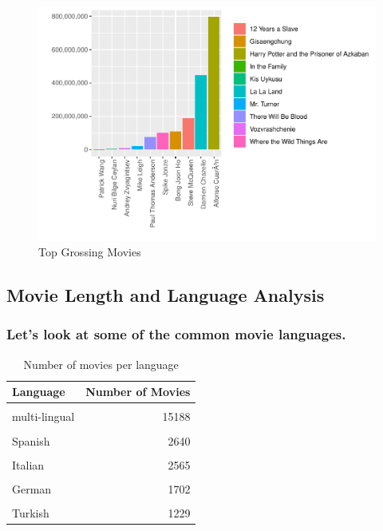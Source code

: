 \documentclass[11pt,a4paper,]{article}
\begin{document}
\begin{figure}[H]

{\centering \includegraphics{Report_files/figure-latex/4-1} 

}

\caption{Top Grossing Movies}\label{fig:4}
\end{figure}

\hypertarget{movie-length-and-language-analysis}{%
\subsection{Movie Length and Language Analysis}\label{movie-length-and-language-analysis}}

\hypertarget{lets-look-at-some-of-the-common-movie-languages.}{%
\subsubsection{Let's look at some of the common movie languages.}\label{lets-look-at-some-of-the-common-movie-languages.}}

\begin{table}[!h]

\caption{\label{tab:langtab}Number of movies per language}
\centering
\begin{tabular}[t]{l|r}
\hline
Language & Number of Movies\\
\hline
\cellcolor{gray!6}{English} & \cellcolor{gray!6}{34519}\\
\hline
multi-lingual & 15188\\
\hline
\cellcolor{gray!6}{French} & \cellcolor{gray!6}{3777}\\
\hline
Spanish & 2640\\
\hline
\cellcolor{gray!6}{Japanese} & \cellcolor{gray!6}{2605}\\
\hline
Italian & 2565\\
\hline
\cellcolor{gray!6}{Hindi} & \cellcolor{gray!6}{1930}\\
\hline
German & 1702\\
\hline
\cellcolor{gray!6}{Russian} & \cellcolor{gray!6}{1235}\\
\hline
Turkish & 1229\\
\hline
\end{tabular}
\end{table}
\end{document}
